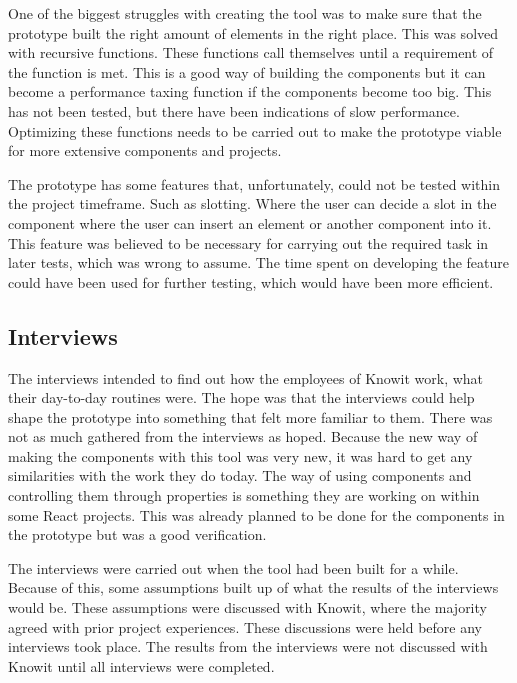 One of the biggest struggles with creating the tool was to make sure that the prototype built the right amount of elements in the right place. This was solved with recursive functions. These functions call themselves until a requirement of the function is met. This is a good way of building the components but it can become a performance taxing function if the components become too big. This has not been tested, but there have been indications of slow performance. Optimizing these functions needs to be carried out to make the prototype viable for more extensive components and projects.

The prototype has some features that, unfortunately, could not be tested within the project timeframe. Such as slotting. Where the user can decide a slot in the component where the user can insert an element or another component into it. This feature was believed to be necessary for carrying out the required task in later tests, which was wrong to assume. The time spent on developing the feature could have been used for further testing, which would have been more efficient.



\subsection{Interviews}%
\label{sub:Interviews}

The interviews intended to find out how the employees of Knowit work, what their day-to-day routines were. The hope was that the interviews could help shape the prototype into something that felt more familiar to them. There was not as much gathered from the interviews as hoped. Because the new way of making the components with this tool was very new, it was hard to get any similarities with the work they do today. The way of using components and controlling them through properties is something they are working on within some React projects. This was already planned to be done for the components in the prototype but was a good verification. 

The interviews were carried out when the tool had been built for a while. Because of this, some assumptions built up of what the results of the interviews would be. These assumptions were discussed with Knowit, where the majority agreed with prior project experiences. These discussions were held before any interviews took place. The results from the interviews were not discussed with Knowit until all interviews were completed. 

